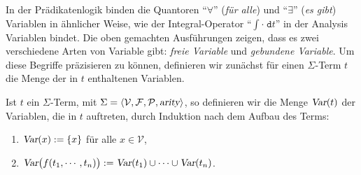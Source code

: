 In der Pr\"{a}dikatenlogik binden die Quantoren ``$\forall$'' (\emph{f\"{u}r alle}) und ``$\exists$''
(\emph{es gibt}) Variablen in \"{a}hnlicher Weise,  wie der Integral-Operator ``$\int \cdot\; \mathtt{d}t$'' in
der Analysis Variablen bindet.  Die oben gemachten Ausf\"{u}hrungen zeigen, dass es zwei verschiedene Arten von 
Variable gibt: \emph{freie Variable} und \emph{gebundene Variable}.
Um diese Begriffe pr\"{a}zisieren zu k\"{o}nnen, definieren wir zun\"{a}chst f\"{u}r einen
$\Sigma$-Term $t$ die Menge der in $t$ enthaltenen Variablen.

\begin{Definition}[$\var(t)$]
    Ist $t$ ein $\Sigma$-Term, mit $\Sigma = \langle \mathcal{V}, \mathcal{F}, \mathcal{P}, \textsl{arity} \rangle$,
    so definieren wir die Menge $\var(t)$ der Variablen, die in $t$
    auftreten, durch Induktion nach dem Aufbau des Terms:
    \begin{enumerate}
    \item $\textsl{Var}(x) := \{ x \}$ \quad f\"{u}r alle $x \in \mathcal{V}$,
    \item $\textsl{Var}\bigl(f(t_1,\cdots,t_n)\bigr) := \textsl{Var}(t_1) \cup \cdots \cup \textsl{Var}(t_n)$.
          \eox
    \end{enumerate}
\end{Definition}


